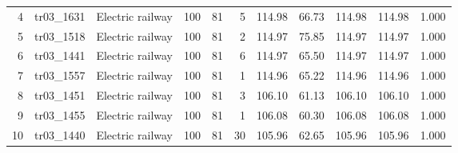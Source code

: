 \begin{table}[H]
{\begin{tabular}{
r
l
>{\raggedright\arraybackslash}p{1.8cm}
r
r
r
r
r
r
r
r
}
4 & tr03\_1631 & \cellcolor{cyan!18}Electric railway & 100 & 81 & 5 & 114.98 & 66.73 & 114.98 & 114.98 & 1.000 \\
5 & tr03\_1518 & \cellcolor{cyan!18}Electric railway & 100 & 81 & 2 & 114.97 & 75.85 & 114.97 & 114.97 & 1.000 \\
6 & tr03\_1441 & \cellcolor{cyan!18}Electric railway & 100 & 81 & 6 & 114.97 & 65.50 & 114.97 & 114.97 & 1.000 \\
7 & tr03\_1557 & \cellcolor{cyan!18}Electric railway & 100 & 81 & 1 & 114.96 & 65.22 & 114.96 & 114.96 & 1.000 \\
8 & tr03\_1451 & \cellcolor{cyan!18}Electric railway & 100 & 81 & 3 & 106.10 & 61.13 & 106.10 & 106.10 & 1.000 \\
9 & tr03\_1455 & \cellcolor{cyan!18}Electric railway & 100 & 81 & 1 & 106.08 & 60.30 & 106.08 & 106.08 & 1.000 \\
10 & tr03\_1440 & \cellcolor{cyan!18}Electric railway & 100 & 81 & 30 & 105.96 & 62.65 & 105.96 & 105.96 & 1.000 \\
\bottomrule
\end{tabular}%
}
\end{table}

